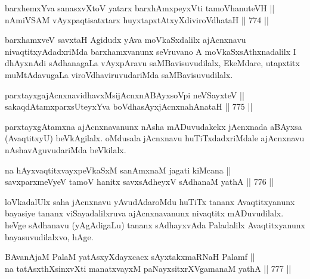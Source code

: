 
\begin{shl}
barxhemxYva sanasxvXtoV yatarx barxhAmxpeyxVti tamoVhanuteVH || \\
nAmiVSAM vAyxpaqtisatxtarx huyxtapxtAtxyXdiviroVdhataH \hfill || 774 ||  
\end{shl}

\begin{artha} 
barxhamxveV savxtaH Agidudx yAva moVkaSxdalilx ajAcnxnavu nivaqtitxyAdadxriMda barxhamxvanunx seVruvano A moVkaSxsAthxnadalilx I dhAyxnAdi sAdhanagaLa vAyxpAravu saMBavisuvudilalx, EkeMdare, utapxtitx muMtAdavugaLa viroVdhaviruvudariMda saMBavisuvudilalx.
\end{artha}


\begin{shl}
parxtayxgajAcnxnavidhavxMsijAcnxnABAyxsoV\s pi neVSayxteV || \\
sakaqdAtamxparxsUteyxYva boVdhasAyxjAcnxnahAnataH \hfill || 775 ||  
\end{shl}

\begin{artha} 
parxtayxgAtamxna ajAcnxnavanunx nAsha mADuvudakekx jAcnxnada aBAyxsa (AvaqtitxyU) beVkAgilalx. oMdusala jAcnxnavu huTiTxdadxriMdale ajAcnxnavu nAshavAguvudariMda beVkilalx.
\end{artha}

\begin{shl}
na hAyxvaqtitxvayxpeVkaSxM sanAmxnaM jagati kiMcana || \\
savxparxmeVyeV tamoV hanitx savxsAdheyxV sAdhanaM yathA \hfill || 776 ||  
\end{shl}

\begin{artha} 
loVkadalUlx saha jAcnxnavu yAvudAdaroMdu huTiTx tananx Avaqtitxyanunx bayasiye tananx viSayadalilxruva ajAcnxnavanunx nivaqtitx mADuvudilalx. heVge sAdhanavu (yAgAdigaLu) tananx sAdhayxvAda Paladalilx Avaqtitxyanunx bayasuvudilalxvo, hAge.
\end{artha}


\begin{shl}
BAvanAjaM PalaM yatAsxyXdayxcacx sAyxtakxmaRNaH Palamf || \\
na tatAsxthXsinxvXti manatxvayxM paNayxsitxrXVgamanaM yathA \hfill || 777 ||  
\end{shl}

